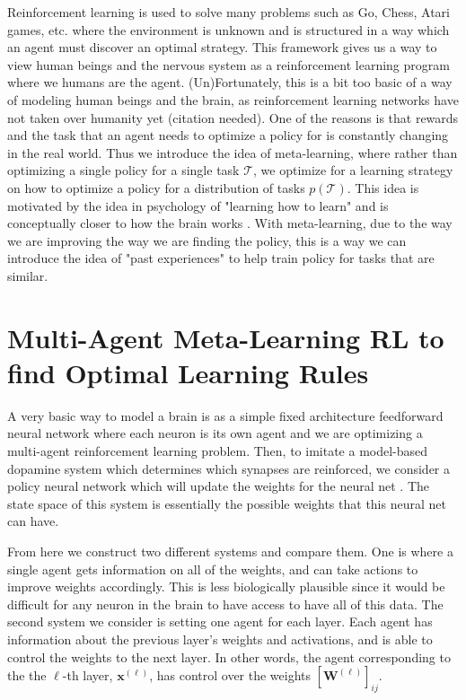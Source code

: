 \documentclass{article}
\def\*#1{\mathbf{#1}}
\begin{document}
Reinforcement learning is used to solve many problems such as Go, Chess, 
Atari games, etc. where the environment is unknown and is structured in 
a way which an agent must discover an optimal strategy. This framework 
gives us a way to view human beings and the nervous system as a 
reinforcement learning program where we humans are the agent. 
(Un)Fortunately, this is a bit too basic of a way of modeling human 
beings and the brain, as reinforcement learning networks have not taken 
over humanity yet (citation needed). One of the reasons is that rewards 
and the task that an agent needs to optimize a policy for is constantly 
changing in the real world. Thus we introduce the idea of meta-learning, 
where rather than optimizing a single policy for a single task $\mathcal{T}$, 
we optimize for a learning strategy on how to optimize a policy for a distribution 
of tasks $p(\mathcal{T})$. This idea is motivated by the idea in psychology of 
 "learning how to learn" and is conceptually closer to how the brain 
works \cite{wang2018pfc}. With meta-learning, due to
the way we are improving the way we are finding the policy, this is a way
we can introduce the idea of "past experiences" to help train policy for 
tasks that are similar.

\section{Multi-Agent Meta-Learning RL to find Optimal Learning Rules}

A very basic way to model a brain is as a simple fixed architecture feedforward neural network 
where each neuron is its own agent and we are optimizing a multi-agent reinforcement learning problem. 
Then, to imitate a model-based dopamine
system which determines which synapses are reinforced, we consider a policy
neural network which will update the weights for the neural net \cite{wang2018pfc, botvinick2019408}. The state space of
this system is essentially the possible weights that this neural net can have. 

From here we construct two different
systems and compare them. One is where a single agent gets information on all of the weights,
and can take actions to improve weights accordingly. This is less biologically plausible since it would be difficult
for any neuron in the brain to have access to have all of this data. The second system we consider is setting one agent
for each layer. Each agent has information about the previous layer's weights and activations, and is able to control
the weights to the next layer. In other words, the agent corresponding to the the $\ell$-th layer, $\*x^{(\ell)}$, has control over the weights 
$[\*W^{(\ell)}]_{ij}$. 
\end{document}
